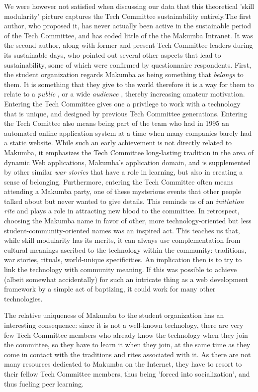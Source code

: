 \documentclass{acm_proc_article-sp}
\begin{document}
We were however not satisfied when discussing our data that this theoretical 'skill modularity' picture captures the Tech Committee sustainability entirely.The first author, who proposed it, has never actually been active in the sustainable period of the Tech Committee, and has coded little of the the Makumba Intranet. It was the second author, along with former and present Tech Committee leaders during its sustainable days, who pointed out  several other aspects that lead to sustainability, some of which were confirmed by questionnaire respondents. First, the student organization regards Makumba as being something that \textit{belongs} to them. It is something that they give to the world therefore it is a way for them to relate to a \textit{public} \cite{stebbins79}, or a wide \textit{audience} \cite{bogdan03}, thereby increasing amateur motivation. Entering the Tech Committee gives one a privilege to work with a technology that is unique, and designed by previous Tech Committee generations. Entering the Tech Comittee also means being part of the team who had in 1995 an automated online application system at a time when many companies barely had a static website. While such an early achievement is not directly related to Makumba, it emphasizes the Tech Committee long-lasting tradition in the area of dynamic Web applications, Makumba's application domain, and is supplemented by other similar \textit{war stories} \cite{orr96} that have a role in learning, but also in creating a sense of belonging. Furthermore, entering the Tech Committee often means attending a Makumba party, one of these mysterious events that other people talked about but never wanted to give details. This reminds us of an \textit{initiation rite} \cite{vanGennep60} and plays a role in attracting new blood to the committee. In retrospect, choosing the Makumba name in favor of other, more technology-oriented but less student-community-oriented names was an inspired act. This teaches us that, while skill modularity has its merits, it can always use complementation from cultural meanings ascribed to the technology within the community: traditions, war stories, rituals, world-unique specificities. An implication then is to try to link the technology with community meaning. If this was possible to achieve (albeit somewhat accidentally) for such an intricate thing as a web development framework by a simple act of baptizing, it could work for many other technologies.

The relative uniqueness of Makumba to the student organization has an interesting consequence: since it is not a well-known technology, there are very few Tech Committee members who already know the technology when they join the committee, so they have to learn it when they join, at the same time as they come in contact with the traditions and rites associated with it. As there are not many resources dedicated to Makumba on the Internet, they have to resort to their fellow Tech Committee members, thus being 'forced into socialization', and thus fueling peer learning.
\end{document}
